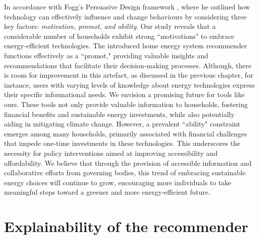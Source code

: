 In accordance with Fogg's Persuasive Design framework \cite{Fogg2009}, 
where he outlined how technology can effectively influence and change behaviours by considering three key factors: 
\emph{motivation, promot, and ability}. 
Our study reveals that a considerable number of households exhibit strong ``motivations" to embrace energy-efficient technologies. 
The introduced home energy system recommender functions effectively as a ``promot," providing valuable insights and recommendations that facilitate their decision-making processes. 
Although, there is room for improvement in this artefact, as discussed in the previous chapter,
for instance, users with varying levels of knowledge about energy technologies express their specific informational needs.
We envision a promising future for tools like ours.
These tools not only provide valuable information to households, fostering financial benefits and sustainable energy investments, while also potentially aiding in mitigating climate change. 
However, a prevalent ``ability" constraint emerges among many households,
primarily associated with financial challenges that impede one-time investments in these technologies. 
This underscores the necessity for policy interventions aimed at improving accessibility and affordability. 
We believe that through the provision of accessible information and collaborative efforts from governing bodies, this trend of embracing sustainable energy choices will continue to grow, encouraging more individuals to take meaningful steps toward a greener and more energy-efficient future.  


\section*{Explainability of the recommender}

